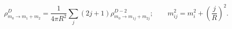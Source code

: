 \begin{equation} 
\rho^D_{m_0\rightarrow m_1+m_2}=\frac{1}{4\pi R^2}\sum_j(2j+1)
  \rho^{D-2}_{m_0\rightarrow m_{1j}+m_{2j}};\qquad 
  m_{ij}^2=m_i^2+\left(\frac{j}{R}\right)^2.
\end{equation}

